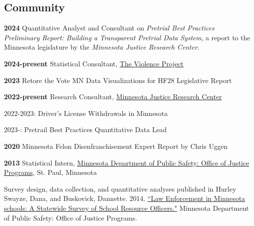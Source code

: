 \documentclass[letterpaper]{article}
\newenvironment{publist}{%
  \begin{list}{}{%
    \setlength{\leftmargin}{0cm}   %
    \setlength{\labelwidth}{2cm}     %
    \setlength{\labelsep}{0.5cm}     %
  }%
}{%
  \end{list}%
}
\renewenvironment{itemize}{
  \begin{list}{}{
    \setlength{\leftmargin}{1.5em}
  }
}{
  \end{list}
}
\begin{document}
\subsection*{Community}

\begin{publist}

\item[\textbf{2024}] Quantitative Analyst and Consultant on \textit{Pretrial Best Practices Preliminary Report: Building a Transparent Pretrial Data System}, a report to the Minnesota legislature by the \textit{Minnesota Justice Research Center}.
\item[\textbf{2024-present}] Statistical Consultant, \href{https://www.theviolenceproject.org/}{The Violence Project}
\item[\textbf{2023}] Retore the Vote MN Data Visualizations for HF28 Legislative Report
\item[\textbf{2022-present}] Research Consultant, \href{https://www.mnjrc.org/about-us}{Minnesota Justice Research Center}

\begin{itemize}

\item 2022-2023: Driver's License Withdrawals in Minnesota
\item 2023-: Pretrail Best Practices Quantitative Data Lead

\end{itemize}

\item[\textbf{2020}] Minnesota Felon Disenfranchisement Expert Report by Chris Uggen 

\item[\textbf{2013}] Statistical Intern, \href{https://dps.mn.gov/divisions/ojp/statistical-analysis-center/Pages/default.aspx}{Minnesota Department of Public Safety: Office of Justice Programs}, St. Paul, Minnesota
\begin{itemize}
	\item Survey design, data collection, and quantitative analyses published in Hurley Swayze, Dana, and  Buskovick, Dannette. 2014. \href{https://dps.mn.gov/divisions/ojp/forms-documents/Documents/SRO20REPORT.pdf}{``Law Enforcement in Minnesota schools: A Statewide Survey of School Resource Officers."} Minnesota Department of Public Safety: Office of Justice Programs.
\end{itemize}

\end{publist}
\end{document}
